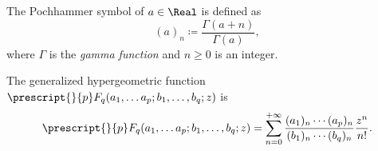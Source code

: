 \begin{Definition}
  The Pochhammer symbol of \(a\in\Real\) is defined as 
  \[
    (a)_n \coloneqq \frac{\Gamma(a+n)}{\Gamma(a)},
  \]
  where \(\Gamma\) is the \emph{gamma function} and \(n\ge0\) is an integer.
\end{Definition}

\begin{Definition}
  The generalized hypergeometric function \(\prescript{}{p}F_q{\left(a_1,\dots a_p; b_1,\dots,b_q;z\right)}\) is
  \[
    \prescript{}{p}F_q{\left(a_1,\dots a_p; b_1,\dots,b_q;z\right)} =
    \sum_{n=0}^{+\infty} \frac{(a_1)_n\cdots(a_p)_n}{(b_1)_n\cdots(b_q)_n}\frac{z^n}{n!}.
  \]
\end{Definition}

